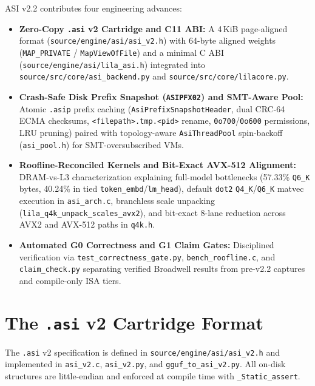 \documentclass[11pt,a4paper]{article}
\begin{document}
ASI v2.2 contributes four engineering advances:
\begin{itemize}
    \item \textbf{Zero-Copy \texttt{.asi} v2 Cartridge and C11 ABI:} A 4\,KiB page-aligned format (\texttt{source/engine/asi/asi\_v2.h}) with 64-byte aligned weights (\texttt{MAP\_PRIVATE} / \texttt{MapViewOfFile}) and a minimal C ABI (\texttt{source/engine/asi/lila\_asi.h}) integrated into \texttt{source/src/core/asi\_backend.py} and \texttt{source/src/core/lilacore.py}.
    \item \textbf{Crash-Safe Disk Prefix Snapshot (\texttt{ASIPFX02}) and SMT-Aware Pool:} Atomic \texttt{.asip} prefix caching (\texttt{AsiPrefixSnapshotHeader}, dual CRC-64 ECMA checksums, \texttt{<filepath>.tmp.<pid>} rename, \texttt{0o700}/\texttt{0o600} permissions, LRU pruning) paired with topology-aware \texttt{AsiThreadPool} spin-backoff (\texttt{asi\_pool.h}) for SMT-oversubscribed VMs.
    \item \textbf{Roofline-Reconciled Kernels and Bit-Exact AVX-512 Alignment:} DRAM-vs-L3 characterization explaining full-model bottlenecks (57.33\% \texttt{Q6\_K} bytes, 40.24\% in tied \texttt{token\_embd}/\texttt{lm\_head}), default \texttt{dot2} \texttt{Q4\_K}/\texttt{Q6\_K} matvec execution in \texttt{asi\_arch.c}, branchless scale unpacking (\texttt{lila\_q4k\_unpack\_scales\_avx2}), and bit-exact 8-lane reduction across AVX2 and AVX-512 paths in \texttt{q4k.h}.
    \item \textbf{Automated G0 Correctness and G1 Claim Gates:} Disciplined verification via \texttt{test\_correctness\_gate.py}, \texttt{bench\_roofline.c}, and \texttt{claim\_check.py} separating verified Broadwell results from pre-v2.2 captures and compile-only ISA tiers.
\end{itemize}

\section{The \texttt{.asi} v2 Cartridge Format}

The \texttt{.asi} v2 specification is defined in \texttt{source/engine/asi/asi\_v2.h} and implemented in \texttt{asi\_v2.c}, \texttt{asi\_v2.py}, and \texttt{gguf\_to\_asi\_v2.py}. All on-disk structures are little-endian and enforced at compile time with \texttt{\_Static\_assert}.
\end{document}

